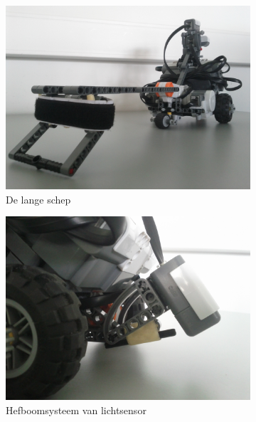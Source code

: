 \documentclass[tt3]{penoverslag}
\begin{document}
\begin{figure}
\centering
	\begin{subfigure}[h]{0.325\textwidth}
	\centering
		\includegraphics[width=\textwidth]{schepGroot}
		\caption{De lange schep}
	\end{subfigure}
	\begin{subfigure}[h]{0.325\textwidth}
		\centering
		\includegraphics[width=\textwidth]{lichtsensor}
		\caption{Hefboomsysteem van lichtsensor}
	\end{subfigure}
	\begin{subfigure}[h]{0.325\textwidth}
		\centering

\end{subfigure}
\end{figure}
\end{document}
